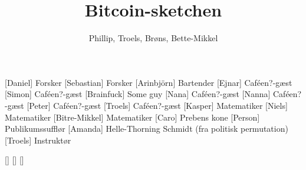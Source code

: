\documentclass[a4paper,11pt]{article}
\title{Bitcoin-sketchen}
\author{Phillip, Troels, Brøns, Bette-Mikkel}
\begin{document}
\maketitle

\begin{roles}
[Daniel] Forsker
[Sebastian] Forsker
[Arinbjörn] Bartender
[Ejnar] Caféen?-gæst
[Simon] Caféen?-gæst
[Brainfuck] Some guy
[Nana] Caféen?-gæst
[Nanna] Caféen?-gæst
[Peter] Caféen?-gæst
[Troels] Caféen?-gæst
[Kasper] Matematiker
[Niels] Matematiker
[Bitre-Mikkel] Matematiker
[Caro] Prebens kone
[Person] Publikumssufflør
[Amanda] Helle-Thorning Schmidt (fra politisk permutation)
[Troels] Instruktør
\end{roles}

\begin{props}
[]
[]
[]
\end{props}
\end{document}
